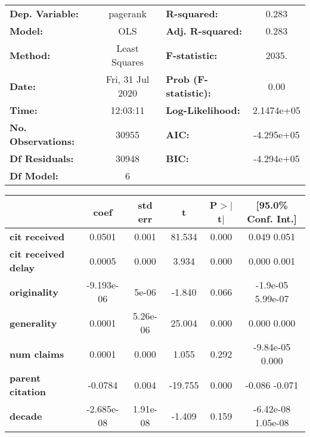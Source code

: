 \begin{center}
\begin{tabular}{lclc}
\toprule
\textbf{Dep. Variable:}     &     pagerank     & \textbf{  R-squared:         } &      0.283   \\
\textbf{Model:}             &       OLS        & \textbf{  Adj. R-squared:    } &      0.283   \\
\textbf{Method:}            &  Least Squares   & \textbf{  F-statistic:       } &      2035.   \\
\textbf{Date:}              & Fri, 31 Jul 2020 & \textbf{  Prob (F-statistic):} &      0.00    \\
\textbf{Time:}              &     12:03:11     & \textbf{  Log-Likelihood:    } &  2.1474e+05  \\
\textbf{No. Observations:}  &       30955      & \textbf{  AIC:               } &  -4.295e+05  \\
\textbf{Df Residuals:}      &       30948      & \textbf{  BIC:               } &  -4.294e+05  \\
\textbf{Df Model:}          &           6      & \textbf{                     } &              \\
\bottomrule
\end{tabular}
\begin{tabular}{lccccc}
                            & \textbf{coef} & \textbf{std err} & \textbf{t} & \textbf{P$>$$|$t$|$} & \textbf{[95.0\% Conf. Int.]}  \\
\midrule
\textbf{cit received}       &       0.0501  &        0.001     &    81.534  &         0.000        &         0.049     0.051       \\
\textbf{cit received delay} &       0.0005  &        0.000     &     3.934  &         0.000        &         0.000     0.001       \\
\textbf{originality}        &   -9.193e-06  &        5e-06     &    -1.840  &         0.066        &      -1.9e-05  5.99e-07       \\
\textbf{generality}         &       0.0001  &     5.26e-06     &    25.004  &         0.000        &         0.000     0.000       \\
\textbf{num claims}         &       0.0001  &        0.000     &     1.055  &         0.292        &     -9.84e-05     0.000       \\
\textbf{parent citation}    &      -0.0784  &        0.004     &   -19.755  &         0.000        &        -0.086    -0.071       \\
\textbf{decade}             &   -2.685e-08  &     1.91e-08     &    -1.409  &         0.159        &     -6.42e-08  1.05e-08       \\

\end{tabular}
\end{center}
